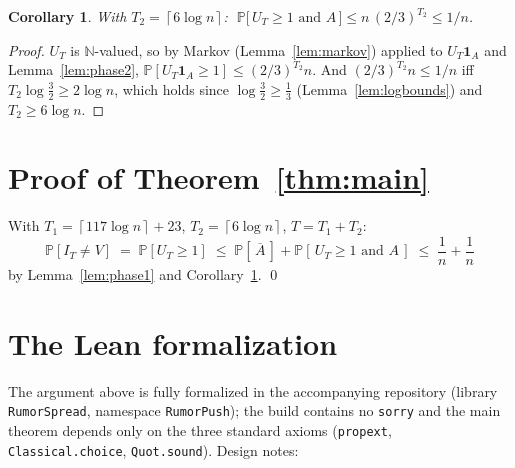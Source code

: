 \documentclass[11pt]{article}
\newtheorem{corollary}[theorem]{Corollary}
\renewcommand{\Pr}{\mathbb{P}}
\newcommand{\N}{\mathbb{N}}
\newcommand{\ceil}[1]{\left\lceil #1 \right\rceil}
\begin{document}
\begin{corollary}\label{cor:phase2}
With $T_2 = \ceil{6 \log n}$:
$\;\Pr\bigl[\, U_T \ge 1 \text{ and } A \,\bigr] \le n\,(2/3)^{T_2} \le 1/n$.
\end{corollary}

\begin{proof}
$U_T$ is $\N$-valued, so by Markov (Lemma~\ref{lem:markov}) applied to
$U_T\mathbf{1}_A$ and Lemma~\ref{lem:phase2},
$\Pr[U_T \mathbf{1}_A \ge 1] \le (2/3)^{T_2} n$.
And $(2/3)^{T_2} n \le 1/n$ iff $T_2 \log\frac32 \ge 2\log n$, which holds
since $\log\frac32 \ge \tfrac13$ (Lemma~\ref{lem:logbounds}) and
$T_2 \ge 6\log n$.
\end{proof}

\section{Proof of Theorem~\ref{thm:main}}

With $T_1 = \ceil{117\log n} + 23$, $T_2 = \ceil{6\log n}$, $T = T_1+T_2$:
\[
  \Pr[I_T \ne V] \;=\; \Pr[U_T \ge 1]
  \;\le\; \Pr[\,\overline{A}\,] + \Pr[\,U_T \ge 1 \text{ and } A\,]
  \;\le\; \frac1n + \frac1n
\]
by Lemma~\ref{lem:phase1} and Corollary~\ref{cor:phase2}. \qed

\section{The Lean formalization}\label{sec:lean}

The argument above is fully formalized in the accompanying repository
(library \texttt{RumorSpread}, namespace \texttt{RumorPush}); the build
contains no \texttt{sorry} and the main theorem depends only on the three
standard axioms (\texttt{propext}, \texttt{Classical.choice},
\texttt{Quot.sound}).  Design notes:
\end{document}
